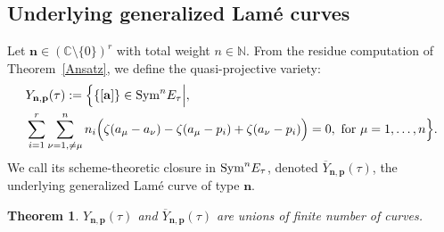 \documentclass[11pt]{amsart}
\newtheorem{theorem}{Theorem}[section]
\theoremstyle{remark}
\numberwithin{equation}{section}
\newcommand{\Sym}{{\rm Sym}}
\begin{document}
\subsection{Underlying generalized Lam\'e curves}
Let $\mathbf{n} \in (\mathbb{C} \setminus \{0\})^r$ with total weight $n \in \mathbb N$.
From the residue computation of Theorem~\ref{Ansatz}, we define the quasi-projective variety:
\[
\begin{split}
&Y_{\mathbf{n},\mathbf{p}}(\tau) := \Big\{  
\{[\mathbf{a}] \} \in {\rm Sym}^n E_\tau \Big|, 
\\
&\sum_{i = 1}^{r} \sum_{\nu = 1, \neq \mu}^n 
n_i\Big(
\zeta(a_\mu - a_\nu) - \zeta(a_\mu - p_{i}) +  \zeta(a_\nu - p_{i})
\Big) = 0, \text{ for }\mu=1,\dots,n \Big\}.
\end{split}
\]
We call its scheme-theoretic closure in $\Sym^n E_\tau$, denoted $\overline{Y}_{\mathbf{n},\mathbf{p}}(\tau)$, the underlying generalized Lam\'e curve of type $\mathbf{n}$.




\begin{theorem} \label{t:GLC}
$Y_{\mathbf{n},\mathbf{p}}(\tau)$ and $\overline{Y}_{\mathbf{n},\mathbf{p}}(\tau)$ are unions of finite number of curves. 
\end{theorem}
\end{document}
